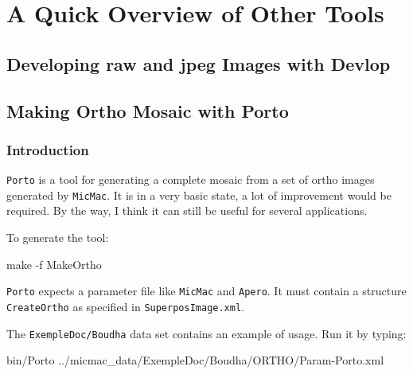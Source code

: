 \chapter{A Quick Overview of Other Tools}





\section{Developing raw and jpeg Images with Devlop}



\section{Making Ortho Mosaic with Porto}
\label{Porto}

\subsection{Introduction}

{\tt Porto}  is a tool for generating a complete mosaic from a set of 
ortho images generated by {\tt MicMac}. It is in a very basic state,
a lot of improvement would be required. By the way, I think  it can
still be useful for several applications.

To generate the tool:

\begin{center}
     make -f MakeOrtho 
\end{center}

{\tt Porto} expects a parameter file like {\tt MicMac} and {\tt Apero}. It
must contain a structure {\tt CreateOrtho} as specified in {\tt SuperposImage.xml}.

The {\tt ExempleDoc/Boudha} data set contains an example of usage. Run it
by typing:

\begin{center}
                  bin/Porto ../micmac\_data/ExempleDoc/Boudha/ORTHO/Param-Porto.xml
\end{center}

